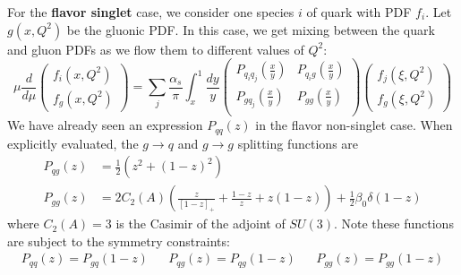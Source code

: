 \documentclass[11pt, oneside]{article}   	%
\theoremstyle{definition}
\begin{document}
For the \textbf{flavor singlet} case, we consider one species $i$ of quark with PDF $f_i$. Let $g(x, Q^2)$ be the gluonic PDF. In this case, we 
get mixing between the quark and gluon PDFs as we flow them to different values of $Q^2$:
\begin{equation}
	\mu\frac{d}{d\mu}\begin{pmatrix} f_i(x, Q^2) \\ f_g(x, Q^2)\end{pmatrix}
	= 
	\sum_j\frac{\alpha_s}{\pi}\int_x^1\frac{dy}{y}
	\begin{pmatrix}
		P_{q_i q_j}\left(\frac{x}{y}\right) & P_{q_i g}\left(\frac{x}{y}\right) \\
		P_{g q_j}\left(\frac{x}{y}\right) & P_{g g}\left(\frac{x}{y}\right) \\
	\end{pmatrix}
	\begin{pmatrix}
		f_j(\xi, Q^2) \\ f_g(\xi, Q^2)
	\end{pmatrix}
\end{equation}
We have already seen an expression $P_{qq}(z)$ in the flavor non-singlet case. When explicitly evaluated, the $g\rightarrow q$ and 
$g\rightarrow g$ splitting functions are
\begin{align}
	P_{qg}(z) &= \frac{1}{2}(z^2 + (1 - z)^2) \\
	P_{gg}(z) &= 2 C_2(A)\left( \frac{z}{[1 - z]_+} + \frac{1 - z}{z} + z(1 - z) \right) + \frac{1}{2}\beta_0\delta(1 - z)
\end{align}
where $C_2(A) = 3$ is the Casimir of the adjoint of $SU(3)$. Note these functions are subject to the symmetry constraints:
\begin{align}
	P_{qq}(z) = P_{gq}(1 - z) && P_{qg}(z) = P_{qg}(1 - z) && P_{gg}(z) = P_{gg}(1 - z)
\end{align}
\end{document}

